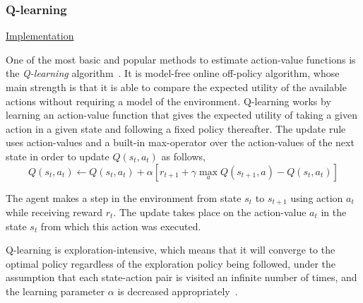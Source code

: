 \documentclass{article}
\begin{document}


\subsubsection{Q-learning}

\noindent \href{https://github.com/davidrobles/mlnd-capstone-code/blob/master/capstone/algorithms/qlearning.py}
     {Implementation}
\break

One of the most basic and popular methods to estimate action-value functions is the
\emph{Q-learning} algorithm~\citep{Watkins1989PhD}. It is model-free online off-policy algorithm,
whose main strength is that it is able to compare the expected utility of the available actions
without requiring a model of the environment. Q-learning works by learning an action-value function
that gives the expected utility of taking a given action in a given state and following a fixed
policy thereafter. The update rule uses action-values and a built-in max-operator over the
action-values of the next state in order to update $Q(s_t, a_t)$ as follows,
%
\begin{equation}
    Q(s_t, a_t) \gets Q(s_t, a_t) + \alpha [r_{t+1} + \gamma \max_a Q(s_{t+1}, a) - Q(s_t, a_t)]
\end{equation}

The agent makes a step in the environment from state $s_t$ to $s_{t+1}$ using action $a_t$ while
receiving reward $r_t$. The update takes place on the action-value $a_t$ in the state $s_t$ from
which this action was executed.

Q-learning is exploration-intensive, which means that it will converge to the optimal policy
regardless of the exploration policy being followed, under the assumption that each state-action
pair is visited an infinite number of times, and the learning parameter $\alpha$ is decreased
appropriately~\citep{Watkins1992Q}.
\end{document}

